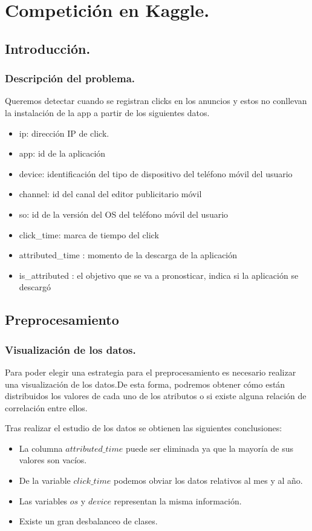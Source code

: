 \documentclass{beamer}
\theoremstyle{plain}
\theoremstyle{definition}
\theoremstyle{plain}
\theoremstyle{definition}
\theoremstyle{remark}
\theoremstyle{definition}
\begin{document}
\section{Competición en Kaggle.}

\subsection{Introducción.}
\begin{frame}
	\tableofcontents[currentsubsection]
\end{frame}
\begin{frame}
	\frametitle{Descripción del problema.}
	Queremos detectar cuando se registran clicks en los anuncios y estos no conllevan la instalación de la app a partir de los siguientes datos.
\begin{itemize}
	
	\item ip: dirección IP de click.
	\item app: id de la aplicación
	\item device: identificación del tipo de dispositivo del teléfono móvil del usuario
	\item channel: id del canal del editor publicitario móvil
	\item so: id de la versión del OS del teléfono móvil del usuario
	\item click\_time: marca de tiempo del click 
	\item attributed\_time : momento de la descarga de la aplicación 
	\item is\_attributed : el objetivo que se va a pronosticar, indica si la aplicación se descargó
\end{itemize}
\end{frame}
\subsection{Preprocesamiento}
\begin{frame}
	\tableofcontents[currentsubsection]
\end{frame}
\begin{frame}
	\frametitle{Visualización de los datos.}
	Para poder elegir una estrategia para el preprocesamiento es necesario
	realizar una visualización de los datos.De esta forma, podremos obtener
	cómo están distribuidos los valores de cada uno de los atributos o si existe alguna relación de correlación entre ellos.
	\medskip
	
	Tras realizar el estudio de los datos se obtienen las siguientes conclusiones:
		\begin{itemize}
		\item La columna $attributed\_time$ puede ser eliminada ya que la mayoría de sus valores son vacíos.
		\item De la variable $click\_time$ podemos obviar los datos relativos al mes y al año.
		\item Las variables $os$ y $device$ representan la misma información.
		\item Existe un gran desbalanceo de clases.
	\end{itemize}
\end{frame}
\end{document}
